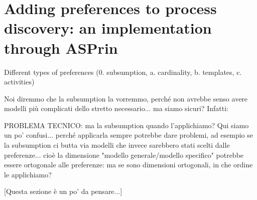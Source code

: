 
\section{Adding preferences to process discovery: an implementation through ASPrin}
\label{sec:tool}


Different types of preferences
(0. subsumption, a. cardinality, b. templates, c. activities)

Noi diremmo che la subsumption la vorremmo, perché non avrebbe senso avere modelli più complicati dello stretto necessario... ma siamo sicuri? Infatti:

PROBLEMA TECNICO: ma la subsumption quando l'applichiamo? Qui siamo un po' confusi... perché applicarla sempre potrebbe dare problemi, ad esempio se la subsumption ci butta via modelli che invece sarebbero stati scelti dalle preferenze... cioè la dimensione "modello generale/modello specifico" potrebbe essere ortogonale alle preferenze: ma se sono dimensioni ortogonali, in che ordine le applichiamo?

[Questa sezione è un po' da pensare...]
